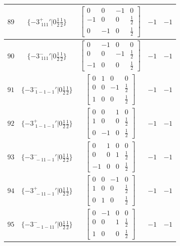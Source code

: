 \documentclass[fleqn,8pt]{jsarticle}
\begin{document}
\begin{longtable}{ccccc}
$ 89 $ & $ \{-3^{+}_{\,\,111}{}'|0 \frac{1}{2} \frac{1}{2}\} $ & $ \begin{bmatrix} 0 & 0 & -1 & 0 \\ -1 & 0 & 0 & \frac{1}{2} \\ 0 & -1 & 0 & \frac{1}{2} \end{bmatrix} $ & $ -1 $ & $ -1 $ \\ \hline
$ 90 $ & $ \{-3^{-}_{\,\,111}{}'|0 \frac{1}{2} \frac{1}{2}\} $ & $ \begin{bmatrix} 0 & -1 & 0 & 0 \\ 0 & 0 & -1 & \frac{1}{2} \\ -1 & 0 & 0 & \frac{1}{2} \end{bmatrix} $ & $ -1 $ & $ -1 $ \\ \hline
$ 91 $ & $ \{-3^{-}_{\,\,1-1-1}{}'|0 \frac{1}{2} \frac{1}{2}\} $ & $ \begin{bmatrix} 0 & 1 & 0 & 0 \\ 0 & 0 & -1 & \frac{1}{2} \\ 1 & 0 & 0 & \frac{1}{2} \end{bmatrix} $ & $ -1 $ & $ -1 $ \\ \hline
$ 92 $ & $ \{-3^{+}_{\,\,1-1-1}{}'|0 \frac{1}{2} \frac{1}{2}\} $ & $ \begin{bmatrix} 0 & 0 & 1 & 0 \\ 1 & 0 & 0 & \frac{1}{2} \\ 0 & -1 & 0 & \frac{1}{2} \end{bmatrix} $ & $ -1 $ & $ -1 $ \\ \hline
$ 93 $ & $ \{-3^{-}_{\,\,-11-1}{}'|0 \frac{1}{2} \frac{1}{2}\} $ & $ \begin{bmatrix} 0 & 1 & 0 & 0 \\ 0 & 0 & 1 & \frac{1}{2} \\ -1 & 0 & 0 & \frac{1}{2} \end{bmatrix} $ & $ -1 $ & $ -1 $ \\ \hline
$ 94 $ & $ \{-3^{+}_{\,\,-11-1}{}'|0 \frac{1}{2} \frac{1}{2}\} $ & $ \begin{bmatrix} 0 & 0 & -1 & 0 \\ 1 & 0 & 0 & \frac{1}{2} \\ 0 & 1 & 0 & \frac{1}{2} \end{bmatrix} $ & $ -1 $ & $ -1 $ \\ \hline
$ 95 $ & $ \{-3^{-}_{\,\,-1-11}{}'|0 \frac{1}{2} \frac{1}{2}\} $ & $ \begin{bmatrix} 0 & -1 & 0 & 0 \\ 0 & 0 & 1 & \frac{1}{2} \\ 1 & 0 & 0 & \frac{1}{2} \end{bmatrix} $ & $ -1 $ & $ -1 $ \\ \hline

\end{longtable}
\end{document}

